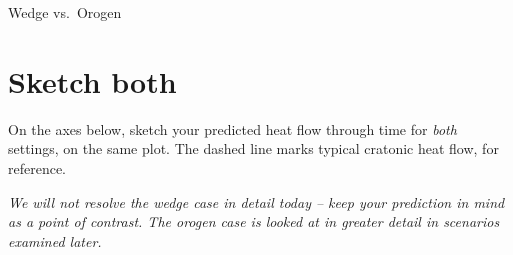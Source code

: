 \begin{activity}[Warm-up]{Wedge vs.\ Orogen}
\section*{Sketch both}
On the axes below, sketch your predicted heat flow through time for \emph{both} settings, on the same plot. The dashed line marks typical cratonic heat flow, for reference.

\begin{center}
\end{center}

\noindent\textit{We will not resolve the wedge case in detail today -- keep your prediction in mind as a point of contrast. The orogen case is looked at in greater detail in scenarios examined later.}
\end{activity}